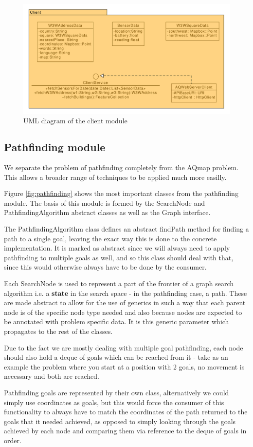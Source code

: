 \documentclass[10pt,a4paper]{article}
\begin{document}
\begin{figure}[h]
    \centering
    \includegraphics[width=\columnwidth]{diagrams/client.uxf.pdf}
    \caption{UML diagram of the client module}
    \label{fig:client}
\end{figure}

\subsection{Pathfinding module}
We separate the problem of pathfinding completely from the AQmap problem. This allows a broader range of techniques to be applied much more easilly.
\par 
\medskip
Figure \ref{fig:pathfinding} shows the most important classes from the pathfinding module. 
The basis of this module is formed by the SearchNode and PathfindingAlgorithm abstract classes as well as the Graph interface.
\par
The PathfindingAlgorithm class defines an abstract findPath method for finding a path to a single goal, leaving the exact way this is done to the concrete implementation. 
It is marked as abstract since we will always need to apply pathfinding to multiple goals as well, and so this class should deal with that, since this would otherwise always have to be done by the consumer.
\par
Each SearchNode is used to represent a part of the frontier of a graph search algorithm i.e. a \textbf{state} in the search space - in the pathfinding case, a path. 
These are made abstract to allow for the use of generics in such a way that each parent node is of the specific node type needed and also because nodes are expected to be annotated with problem specific data.
It is this generic parameter which propagates to the rest of the classes.
\par
Due to the fact we are mostly dealing with multiple goal pathfinding, each node should also hold a deque of goals which can be reached from it - take as an example the problem where you start at a position with 2 goals, no movement is necessary and both are reached.
\par
Pathfinding goals are represented by their own class, alternatively we could simply use coordinates as goals, 
but this would force the consumer of this functionality to always have to match the coordinates of the path returned to the goals that it needed achieved,
as opposed to simply looking through the goals achieved by each node and comparing them via reference to the deque of goals in order.
\end{document}
